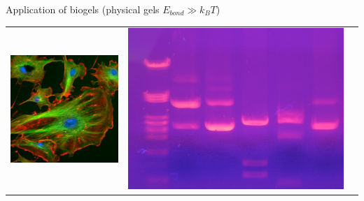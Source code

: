 \documentclass[xcolor=table]{beamer}
\begin{document}
\begin{frame}{Application of biogels \textup{\normalsize(physical gels
$E_{bond}\gg k_B T$)}}
\begin{tabu}{cX[c]c}
\includegraphics[height=0.3\textheight]{cell_mech} &
\includegraphics[height=0.3\textheight]{electrophoresis} &

\end{tabu}
\end{frame}
\end{document}
